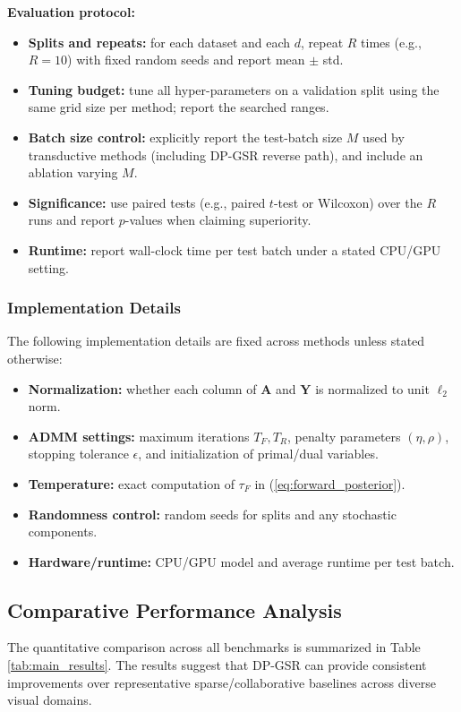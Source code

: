 \documentclass[10pt,comsoc]{IEEEtran}
\begin{document}
\textbf{Evaluation protocol:}
\begin{itemize}
    \item \textbf{Splits and repeats:} for each dataset and each $d$, repeat $R$ times (e.g., $R=10$) with fixed random seeds and report mean $\pm$ std.
    \item \textbf{Tuning budget:} tune all hyper-parameters on a validation split using the same grid size per method; report the searched ranges.
    \item \textbf{Batch size control:} explicitly report the test-batch size $M$ used by transductive methods (including DP-GSR reverse path), and include an ablation varying $M$.
    \item \textbf{Significance:} use paired tests (e.g., paired $t$-test or Wilcoxon) over the $R$ runs and report $p$-values when claiming superiority.
    \item \textbf{Runtime:} report wall-clock time per test batch under a stated CPU/GPU setting.
\end{itemize}

\subsubsection{Implementation Details}
The following implementation details are fixed across methods unless stated otherwise:
\begin{itemize}
    \item \textbf{Normalization:} whether each column of $\mathbf{A}$ and $\mathbf{Y}$ is normalized to unit $\ell_2$ norm.
    \item \textbf{ADMM settings:} maximum iterations $T_F,T_R$, penalty parameters $(\eta,\rho)$, stopping tolerance $\epsilon$, and initialization of primal/dual variables.
    \item \textbf{Temperature:} exact computation of $\tau_F$ in (\ref{eq:forward_posterior}).
    \item \textbf{Randomness control:} random seeds for splits and any stochastic components.
    \item \textbf{Hardware/runtime:} CPU/GPU model and average runtime per test batch.
\end{itemize}

\subsection{Comparative Performance Analysis}
The quantitative comparison across all benchmarks is summarized in Table \ref{tab:main_results}. The results suggest that DP-GSR can provide consistent improvements over representative sparse/collaborative baselines across diverse visual domains. 
\end{document}
